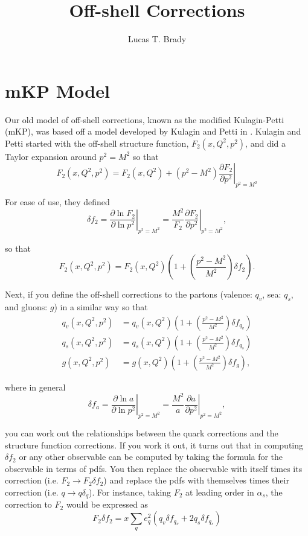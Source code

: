 \documentclass[12pt]{article}
\title{Off-shell Corrections}
\author{Lucas T. Brady}
\newcommand{\pder}[2]{\frac{\partial #1}{\partial #2}}
\begin{document}
\maketitle

\section{mKP Model}

Our old model of off-shell corrections, known as the modified Kulagin-Petti (mKP), was based off a model developed by Kulagin and Petti in \cite{KP}.  Kulagin and Petti started with the off-shell structure function, $F_2(x,Q^2,p^2)$, and did a Taylor expansion around $p^2=M^2$ so that
\begin{equation}
\label{eq:taylor}
F_2(x,Q^2,p^2) = F_2(x,Q^2)+\left(p^2-M^2\right)\left.\pder{F_2}{p^2}\right|_{p^2=M^2}
\end{equation}

For ease of use, they defined
\begin{equation}
\delta f_2 = \left.\pder{\ln{F_2}}{\ln{p^2}}\right|_{p^2=M^2} = \frac{M^2}{F_2}\left.\pder{F_2}{p^2}\right|_{p^2=M^2},
\end{equation}

so that 
\begin{equation}
\label{eq:taylor2}
F_2(x,Q^2,p^2) = F_2(x,Q^2)\left(1+\left(\frac{p^2-M^2}{M^2}\right)\delta f_2\right).
\end{equation}

Next, if you define the off-shell corrections to the partons (valence: $q_v$, sea: $q_s$, and gluons: $g$) in a similar way so that
\begin{subequations}
\begin{align}
q_v(x,Q^2,p^2) &= q_v(x,Q^2)\left(1+\left(\frac{p^2-M^2}{M^2}\right)\delta f_{q_v}\right)\\
q_s(x,Q^2,p^2) &= q_s(x,Q^2)\left(1+\left(\frac{p^2-M^2}{M^2}\right)\delta f_{q_s}\right)\\
g(x,Q^2,p^2) &= g(x,Q^2)\left(1+\left(\frac{p^2-M^2}{M^2}\right)\delta f_{g}\right),
\end{align}
\end{subequations}

where in general
\begin{equation}
\delta f_a = \left.\pder{\ln{a}}{\ln{p^2}}\right|_{p^2=M^2} = \frac{M^2}{a}\left.\pder{a}{p^2}\right|_{p^2=M^2},
\end{equation}

you can work out the relationships between the quark corrections and the structure function corrections.  If you work it out, it turns out that in computing $\delta f_2$ or any other observable can be computed by taking the formula for the observable in terms of pdfs.  You then replace the observable with itself times its correction (i.e. $F_2\to F_2\delta f_2$) and replace the pdfs with themselves times their correction (i.e. $q\to q\delta_q$).  For instance, taking $F_2$ at leading order in $\alpha_s$, the correction to $F_2$ would be expressed as
\begin{equation}
\label{eq:quark_expand}
F_2\delta f_2 = x\sum_{q}e_q^2(q_v\delta f_{q_v}+2q_s\delta f_{q_s})
\end{equation}
\end{document}
